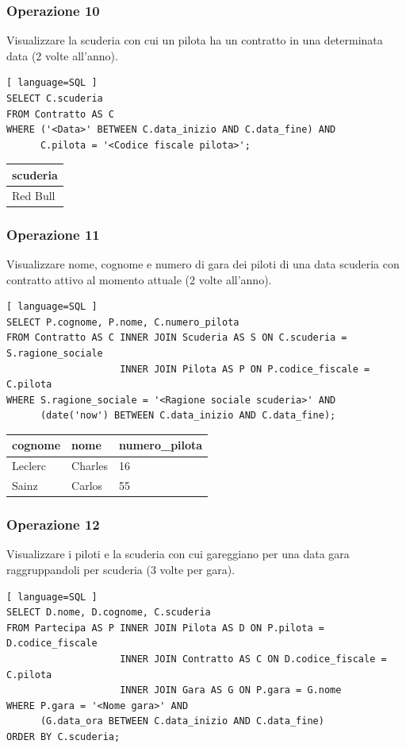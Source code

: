 \documentclass[11pt]{article}
\begin{document}
\subsubsection{Operazione 10}
Visualizzare la scuderia con cui un pilota ha un contratto in una determinata data (2 volte all'anno).
\begin{lstlisting}[ language=SQL ]
SELECT C.scuderia
FROM Contratto AS C
WHERE ('<Data>' BETWEEN C.data_inizio AND C.data_fine) AND
      C.pilota = '<Codice fiscale pilota>';
\end{lstlisting}

\begin{table}[!ht]
    \centering
    \begin{tabular}{|l|}
    \hline
        scuderia \\ \hline
        Red Bull \\ \hline
    \end{tabular}
\end{table}


\subsubsection{Operazione 11}
Visualizzare nome, cognome e numero di gara dei piloti di una data scuderia con contratto attivo al momento attuale (2 volte all'anno).
\begin{lstlisting}[ language=SQL ]
SELECT P.cognome, P.nome, C.numero_pilota
FROM Contratto AS C INNER JOIN Scuderia AS S ON C.scuderia = S.ragione_sociale 
                    INNER JOIN Pilota AS P ON P.codice_fiscale = C.pilota
WHERE S.ragione_sociale = '<Ragione sociale scuderia>' AND
      (date('now') BETWEEN C.data_inizio AND C.data_fine);
\end{lstlisting}

\begin{table}[!ht]
    \centering
    \begin{tabular}{|l|l|l|}
    \hline
        cognome & nome & numero\_pilota \\ \hline
        Leclerc & Charles & 16 \\ \hline
        Sainz & Carlos & 55 \\ \hline
    \end{tabular}
\end{table}


\subsubsection{Operazione 12}
Visualizzare i piloti e la scuderia con cui gareggiano per una data gara raggruppandoli per scuderia (3 volte per gara).
\begin{lstlisting}[ language=SQL ]
SELECT D.nome, D.cognome, C.scuderia
FROM Partecipa AS P INNER JOIN Pilota AS D ON P.pilota = D.codice_fiscale
                    INNER JOIN Contratto AS C ON D.codice_fiscale = C.pilota
                    INNER JOIN Gara AS G ON P.gara = G.nome
WHERE P.gara = '<Nome gara>' AND
      (G.data_ora BETWEEN C.data_inizio AND C.data_fine)
ORDER BY C.scuderia;
\end{lstlisting}
\end{document}
